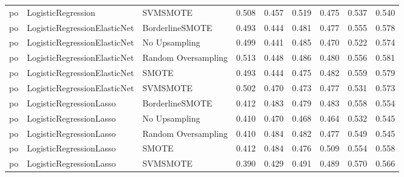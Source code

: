 \begin{tabular}{lllllllll}
      po &           LogisticRegression &            SVMSMOTE & 0.508 &                     0.457 &                 0.519 &                  0.475 &                                   0.537 &     0.540 \\
      po & LogisticRegressionElasticNet &     BorderlineSMOTE & 0.493 &                     0.444 &                 0.481 &                  0.477 &                                   0.555 &     0.578 \\
      po & LogisticRegressionElasticNet &       No Upsampling & 0.499 &                     0.441 &                 0.485 &                  0.470 &                                   0.522 &     0.574 \\
      po & LogisticRegressionElasticNet & Random Oversampling & 0.513 &                     0.448 &                 0.486 &                  0.480 &                                   0.556 &     0.581 \\
      po & LogisticRegressionElasticNet &               SMOTE & 0.493 &                     0.444 &                 0.475 &                  0.482 &                                   0.559 &     0.579 \\
      po & LogisticRegressionElasticNet &            SVMSMOTE & 0.502 &                     0.470 &                 0.473 &                  0.477 &                                   0.531 &     0.573 \\
      po &      LogisticRegressionLasso &     BorderlineSMOTE & 0.412 &                     0.483 &                 0.479 &                  0.483 &                                   0.558 &     0.554 \\
      po &      LogisticRegressionLasso &       No Upsampling & 0.410 &                     0.470 &                 0.468 &                  0.464 &                                   0.532 &     0.545 \\
      po &      LogisticRegressionLasso & Random Oversampling & 0.410 &                     0.484 &                 0.482 &                  0.477 &                                   0.549 &     0.545 \\
      po &      LogisticRegressionLasso &               SMOTE & 0.412 &                     0.484 &                 0.476 &                  0.509 &                                   0.554 &     0.558 \\
      po &      LogisticRegressionLasso &            SVMSMOTE & 0.390 &                     0.429 &                 0.491 &                  0.489 &                                   0.570 &     0.566 \\

\end{tabular}
